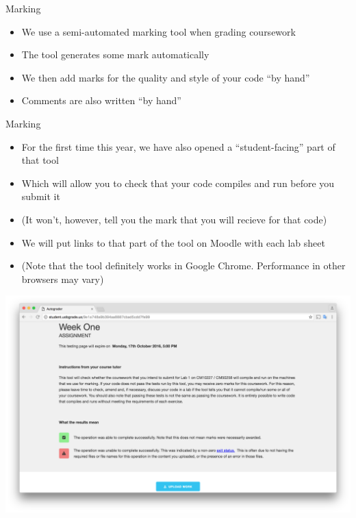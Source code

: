 \documentclass{beamer}
\begin{document}
\begin{frame}
Marking
\begin{itemize}
\item We use a semi-automated marking tool when grading coursework
\item The tool generates some mark automatically 
\item We then add marks for the quality and style of your code ``by hand''
\item Comments are also written ``by hand''
\end{itemize}
\end{frame}

\begin{frame}
Marking
\begin{itemize}
\item For the first time this year, we have also opened a ``student-facing'' part of that tool
\item Which will allow you to check that your code compiles and run before you submit it
\item (It won't, however, tell you the mark that you will recieve for that code)
\item We will put links to that part of the tool on Moodle with each lab sheet
\item (Note that the tool definitely works in Google Chrome. Performance in other browsers may vary)
\end{itemize}
\end{frame}

\begin{frame}[fragile]
\includegraphics[scale=0.12]{Auto1.png}
\end{frame}
\end{document}

